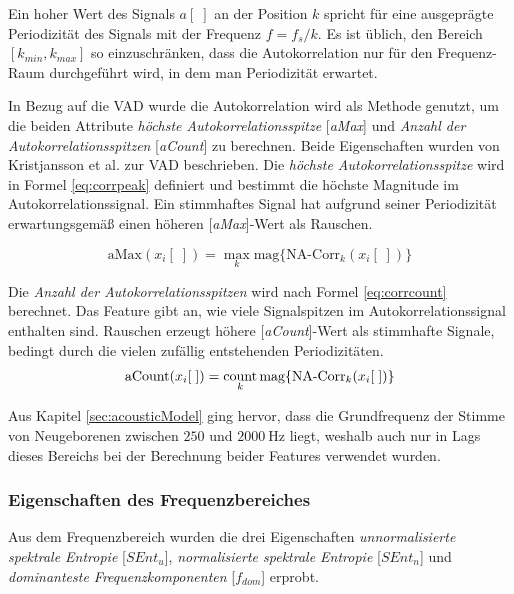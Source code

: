 Ein hoher Wert des Signals $a[\;]$ an der Position $k$ spricht für eine ausgeprägte Periodizität des Signals mit der Frequenz $f =  f_s / k $. Es ist üblich, den Bereich $[k_{min},k_{max}]$ so einzuschränken, dass die Autokorrelation nur für den Frequenz-Raum durchgeführt wird, in dem man Periodizität erwartet.\cite{vad_Lisboa}

In Bezug auf die VAD wurde die Autokorrelation wird als Methode genutzt, um die beiden Attribute \emph{höchste Autokorrelationsspitze} [\emph{aMax}] und \emph{Anzahl der Autokorrelationsspitzen} [\emph{aCount}] zu berechnen. Beide Eigenschaften wurden von Kristjansson et al. \cite[S. 1 - 2]{vad_Lisboa} zur VAD beschrieben. Die \emph{höchste Autokorrelationsspitze} wird in Formel \ref{eq:corrpeak} definiert und bestimmt die höchste Magnitude im Autokorrelationssignal. Ein stimmhaftes Signal hat aufgrund seiner Periodizität erwartungsgemäß einen höheren [\emph{aMax}]-Wert als Rauschen.

\begin{equation}
\text{aMax}(x_i[\;]) = \max_{k}\text{mag}\{\text{NA-Corr}_k(x_i[\;])\}
\label{eq:corrpeak}
\end{equation}

Die \emph{Anzahl der Autokorrelationsspitzen} wird nach Formel \ref{eq:corrcount} berechnet. Das Feature gibt an, wie viele Signalspitzen im Autokorrelationssignal enthalten sind. Rauschen erzeugt höhere [\emph{aCount}]-Wert als stimmhafte Signale, bedingt durch die vielen zufällig entstehenden Periodizitäten.
\begin{equation}
\text{aCount}(x_i[\;]) = \operatorname*{count}_{k}\text{mag}\{\text{NA-Corr}_k(x_i[\;])\}
\label{eq:corrcount}
\end{equation}

Aus Kapitel \ref{sec:acousticModel} ging hervor, dass die Grundfrequenz der Stimme von Neugeborenen zwischen $250$ und $\SI{2000}{\hertz}$ liegt, weshalb auch nur in Lags dieses Bereichs bei der Berechnung beider Features verwendet wurden.

\subsubsection{Eigenschaften des Frequenzbereiches}

Aus dem Frequenzbereich wurden die drei Eigenschaften \emph{unnormalisierte spektrale Entropie} [$SEnt_{u}$], \emph{normalisierte spektrale Entropie}  [$SEnt_{n}$] und \emph{dominanteste Frequenzkomponenten} [$f_{dom}$] erprobt.

